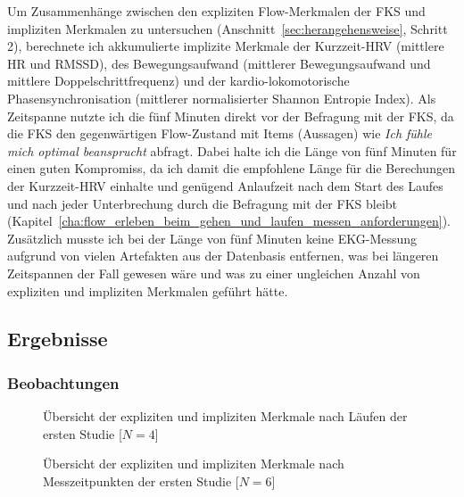 Um Zusammenhänge zwischen den expliziten Flow-Merkmalen der \ac{FKS} und impliziten Merkmalen zu untersuchen (Anschnitt~\ref{sec:herangehensweise}, Schritt 2), berechnete ich akkumulierte implizite Merkmale der Kurzzeit-\ac{HRV} (mittlere \ac{HR} und \acs{RMSSD}), des Bewegungsaufwand (mittlerer Bewegungsaufwand und mittlere Doppelschrittfrequenz) und der kardio-lokomotorische Phasensynchronisation (mittlerer normalisierter Shannon Entropie Index). Als Zeitspanne nutzte ich die fünf Minuten direkt vor der Befragung mit der \ac{FKS}, da die \ac{FKS} den gegenwärtigen Flow-Zustand mit Items (Aussagen) wie \emph{Ich fühle mich optimal beansprucht} abfragt. Dabei halte ich die Länge von fünf Minuten für einen guten Kompromiss, da ich damit die empfohlene Länge für die Berechungen der Kurzzeit-\ac{HRV} \citep[][S.~360]{TaskForce1996} einhalte und genügend Anlaufzeit nach dem Start des Laufes und nach jeder Unterbrechung durch die Befragung mit der \ac{FKS} bleibt (Kapitel~\ref{cha:flow_erleben_beim_gehen_und_laufen_messen_anforderungen}). Zusätzlich musste ich bei der Länge von fünf Minuten keine \ac{EKG}-Messung aufgrund von vielen Artefakten aus der Datenbasis entfernen, was bei längeren Zeitspannen der Fall gewesen wäre und was zu einer ungleichen Anzahl von expliziten und impliziten Merkmalen geführt hätte.

\subsection{Ergebnisse} 

\label{sub:ergebnisse}

\subsubsection{Beobachtungen} 

\label{ssub:beobachtungen} 
\begin{figure}
	[!htb]  \caption[Übersicht der expliziten und impliziten Merkmale nach Läufen der ersten Studie]{Übersicht der expliziten und impliziten Merkmale nach Läufen der ersten Studie [$N = 4$]} \label{fig:ubersicht_nach_laufen_1} 
\end{figure}
\begin{figure}
	[!htb]  \caption[Übersicht der expliziten und impliziten Merkmale nach Messzeitpunkten der ersten Studie]{Übersicht der expliziten und impliziten Merkmale nach Messzeitpunkten der ersten Studie [$N = 6$]} \label{fig:ubersicht_nach_messzeitpunkten_1} 
\end{figure}

